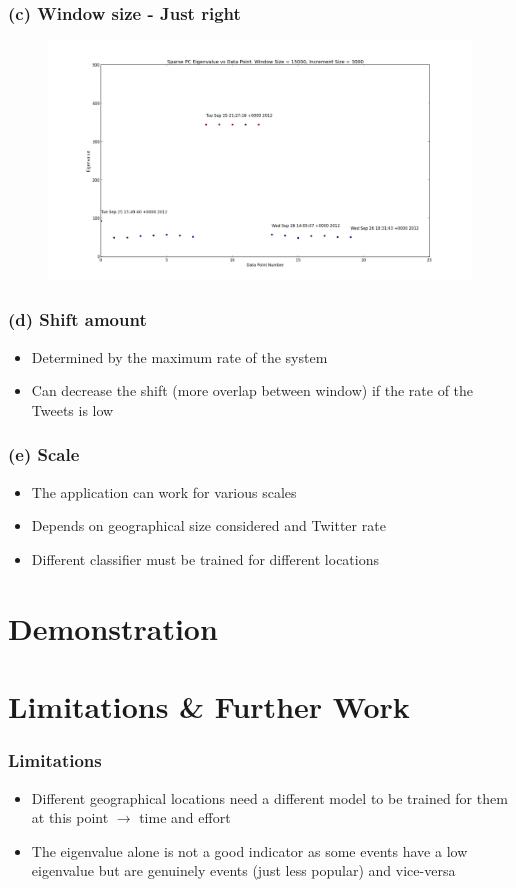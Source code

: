 \documentclass{beamer}
\begin{document}
\begin{frame}

\frametitle{(c) Window size - Just right}

\begin{figure}
\includegraphics[scale=0.2]{Testing_Streaming_App_15000_3000.png}
\end{figure}

\end{frame}

\begin{frame}
\frametitle{(d) Shift amount}
\begin{itemize}
\item Determined by the maximum rate of the system
\item Can decrease the shift (more overlap between window) if the rate of the Tweets is low

\end{itemize}
\end{frame}

\begin{frame}
\frametitle{(e) Scale}
\begin{itemize}
\item The application can work for various scales
\item Depends on geographical size considered and Twitter rate
\item Different classifier must be trained for different locations

\end{itemize}
\end{frame}
\section{Demonstration}

\section{Limitations \& Further Work}
\begin{frame}
\frametitle{Limitations}
\begin{itemize}
\item Different geographical locations need a different model to be trained for them at this point $\rightarrow$ time and effort
\item The eigenvalue alone is not a good indicator as some events have a low eigenvalue but are genuinely events (just less popular) and vice-versa
\end{itemize}
\end{frame}
\end{document}
